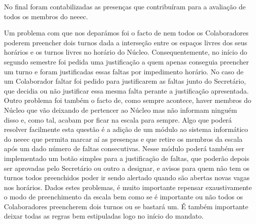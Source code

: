 No final foram contabilizadas as presenças que contribuíram para a avaliação de todos os membros do \acrshort{neeec}. 

Um problema com que nos deparámos foi o facto de nem todos os Colaboradores poderem preencher dois turnos dada a interseção entre os espaços livres dos seus horários e os turnos livres no horário do Núcleo. Consequentemente, no início do segundo semestre foi pedida uma justificação a quem apenas conseguia preencher um turno e foram justificadas essas faltas por impedimento horário. No caso de um Colaborador faltar foi pedido para justificarem as faltas junto do Secretário, que decidia ou não justificar essa mesma falta perante a justificação apresentada. Outro problema foi também o facto de, como sempre acontece, haver membros do Núcleo que vão deixando de pertencer ao Núcleo mas não informam ninguém disso e, como tal, acabam por ficar na escala para sempre. Algo que poderá resolver facilmente esta questão é a adição de um módulo ao sistema informático do \acrshort{neeec} que permita marcar aí as presenças e que retire os membros da escala após um dado número de faltas consecutivas. Nesse módulo poderá também ser implementado um botão simples para a justificação de faltas, que poderão depois ser aprovadas pelo Secretário ou outro a designar, e avisos para quem não tem os turnos todos preenchidos poder ir sendo alertado quando são abertas novas vagas nos horários. Dados estes problemas, é muito importante repensar exaustivamente o modo de preenchimento da escala bem como se é importante ou não todos os Colaboradores preencherem dois turnos ou se bastará um. É também importante deixar todas as regras bem estipuladas logo no início do mandato.